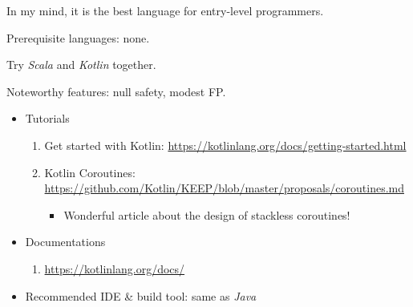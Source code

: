\documentclass{article}
\begin{document}
\begin{itemize}
    In my mind, it is the best language for entry-level programmers.
    
    Prerequisite languages: none.
    
    Try \emph{Scala} and \emph{Kotlin} together.
    
    Noteworthy features: null safety, modest FP.
    \begin{itemize}
        \item Tutorials
        \begin{enumerate}
            \item Get started with Kotlin:
            \href{https://kotlinlang.org/docs/getting-started.html}{https://kotlinlang.org/docs/getting-started.html}
            \item Kotlin Coroutines:\\
            \href{https://github.com/Kotlin/KEEP/blob/master/proposals/coroutines.md}{https://github.com/Kotlin/KEEP/blob/master/proposals/coroutines.md}
            \begin{itemize}
                \item Wonderful article about the design of stackless coroutines!
            \end{itemize}
        \end{enumerate}
        \item Documentations
        \begin{enumerate}
            \item        \href{https://kotlinlang.org/docs/}{https://kotlinlang.org/docs/}
        \end{enumerate}
        \item Recommended IDE \& build tool: same as \emph{Java}
    \end{itemize}
    

\end{itemize}
\end{document}
